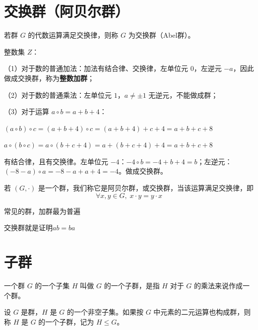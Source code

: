 \section{交换群（阿贝尔群）}

\begin{definition}[交换群]
若群 $G$ 的代数运算满足交换律，则称 $G$ 为交换群（Abel群）。
\end{definition}

\begin{example}
整数集 $Z$：

（1）对于数的普通加法：加法有结合律、交换律，左单位元 $0$，左逆元 $-a$，因此做成交换群，称为\textbf{整数加群}；

（2）对于数的普通乘法：左单位元 $1$，$a\ne\pm1$ 无逆元，不能做成群；

（3）对于运算 $a\circ b=a+b+4$：

$(a\circ b)\circ c=(a+b+4)\circ c=(a+b+4)+c+4=a+b+c+8$

$a\circ(b\circ c)=a\circ(b+c+4)=a+(b+c+4)+4=a+b+c+8$

有结合律，且有交换律。左单位元 $-4$：$-4\circ b=-4+b+4=b$；左逆元：$(-8-a)\circ a=-8-a+a+4=-4$。做成交换群。
\end{example}

\begin{definition}[定义 1.10：阿贝尔群]
若 $(G,\cdot)$ 是一个群，我们称它是阿贝尔群，或交换群，当该运算满足交换律，即
\[
\forall x,y\in G,\;x\cdot y=y\cdot x
\]
\end{definition}

\begin{note}[1 10阿贝尔群]
常见的群，加群最为普遍
\end{note}

\begin{note}
交换群就是证明$ab=ba$
\end{note}

\section{子群}

\begin{definition}[子群]
一个群 $G$ 的一个子集 $H$ 叫做 $G$ 的一个子群，是指 $H$ 对于 $G$ 的乘法来说作成一个群。

设 $G$ 是群，$H$ 是 $G$ 的一个非空子集。如果按 $G$ 中元素的二元运算也构成群，则称 $H$ 是 $G$ 的一个子群，记为 $H\le G$。
\end{definition}

